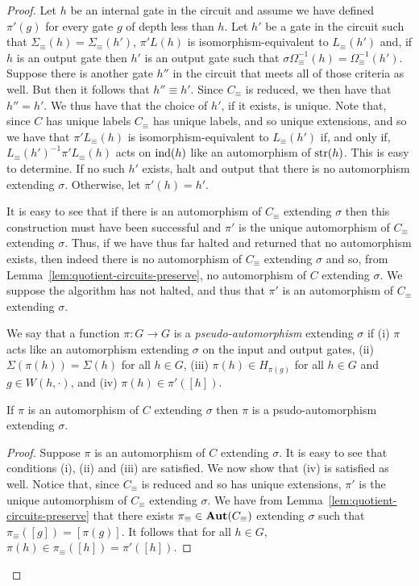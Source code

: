 \documentclass[../paper.tex]{subfiles}
\begin{document}
\begin{proof}
  Let $h$ be an internal gate in the circuit and assume we have defined
  $\pi'(g)$ for every gate $g$ of depth less than $h$. Let $h'$ be a gate in the
  circuit such that $\Sigma_\equiv(h) = \Sigma_\equiv (h')$, $\pi' L(h)$ is
  isomorphism-equivalent to $L_\equiv(h')$ and, if $h$ is an output gate then
  $h'$ is an output gate such that $\sigma \Omega^{-1}_\equiv(h) =
  \Omega^{-1}_\equiv(h')$. Suppose there is another gate $h''$ in the circuit
  that meets all of those criteria as well. But then it follows that $h'' \equiv
  h'$. Since $C_\equiv$ is reduced, we then have that $h'' = h'$.  We thus have
  that the choice of $h'$, if it exists, is unique. Note that, since $C$ has
  unique labels $C_\equiv$ has unique labels, and so unique extensions, and so
  we have that $\pi' L_\equiv(h)$ is isomorphism-equivalent to $L_\equiv(h')$
  if, and only if, $L_\equiv(h')^{-1}\pi'L_\equiv(h)$ acts on $\text{\upshape ind}(h)$ like an
  automorphism of $\text{str}(h)$. This is easy to determine. If no such $h'$ exists,
  halt and output that there is no automorphism extending $\sigma$. Otherwise,
  let $\pi'(h) = h'$.

  It is easy to see that if there is an automorphism of $C_\equiv$ extending
  $\sigma$ then this construction must have been successful and $\pi'$ is the
  unique automorphism of $C_\equiv$ extending $\sigma$. Thus, if we have thus
  far halted and returned that no automorphism exists, then indeed there is no
  automorphism of $C_\equiv$ extending $\sigma$ and so, from
  Lemma~\ref{lem:quotient-circuits-preserve}, no automorphism of $C$ extending
  $\sigma$. We suppose the algorithm has not halted, and thus that $\pi'$ is an
  automorphism of $C_\equiv$ extending $\sigma$.

  We say that a function $\pi : G \rightarrow G$ is a \emph{pseudo-automorphism}
  extending $\sigma$ if (i) $\pi$ acts like an automorphism extending $\sigma$
  on the input and output gates, (ii) $\Sigma (\pi (h)) = \Sigma(h)$ for all $h
  \in G$, (iii) $\pi(h) \in H_{\pi(g)}$ for all $h \in G$ and $g \in W(h,
  \cdot)$, and (iv) $\pi (h) \in \pi'([h])$.

\begin{claim}
  If $\pi$ is an automorphism of $C$ extending $\sigma$ then $\pi$ is a
  psudo-automorphism extending $\sigma$.
\end{claim}
\begin{proof}
  Suppose $\pi$ is an automorphism of $C$ extending $\sigma$. It is easy to see
  that conditions (i), (ii) and (iii) are satisfied. We now show that (iv) is
  satisfied as well. Notice that, since $C_\equiv$ is reduced and so has unique
  extensions, $\pi'$ is the unique automorphism of $C_\equiv$ extending
  $\sigma$. We have from Lemma~\ref{lem:quotient-circuits-preserve} that there
  exists $\pi_\equiv \in \text{\textbf{Aut}}(C_\equiv)$ extending $\sigma$ such that
  $\pi_\equiv ([g]) = [\pi(g)]$. It follows that for all $h \in G$, $\pi(h) \in
  \pi_\equiv([h]) = \pi'([h])$.
\end{proof}


\end{proof}
\end{document}
